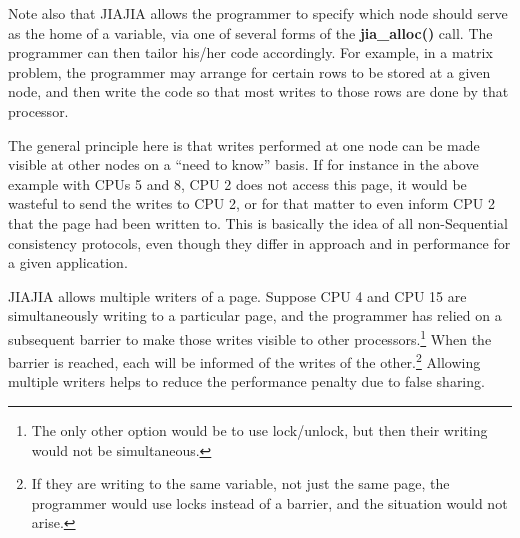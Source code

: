 Note also that JIAJIA allows the programmer to specify which node should
serve as the home of a variable, via one of several forms of the {\bf
jia\_alloc()} call.  The programmer can then tailor his/her code
accordingly.  For example, in a matrix problem, the programmer may
arrange for certain rows to be stored at a given node, and then write
the code so that most writes to those rows are done by that processor.

The general principle here is that writes performed at one node can be
made visible at other nodes on a ``need to know'' basis.  If for
instance in the above example with CPUs 5 and 8, CPU 2 does not access
this page, it would be wasteful to send the writes to CPU 2, or for that
matter to even inform CPU 2 that the page had been written to.  This is
basically the idea of all non-Sequential consistency protocols, even
though they differ in approach and in performance for a given
application.

JIAJIA allows multiple writers of a page.  Suppose CPU 4 and CPU 15 are
simultaneously writing to a particular page, and the programmer has
relied on a subsequent barrier to make those writes visible to other
processors.\footnote{The only other option would be to use lock/unlock,
but then their writing would not be simultaneous.}  When the barrier is
reached, each will be informed of the writes of the other.\footnote{If
they are writing to the same variable, not just the same page, the
programmer would use locks instead of a barrier, and the situation would
not arise.}  Allowing multiple writers helps to reduce the performance
penalty due to false sharing.

% 
% 
% 
% 
% 
% 
% 
% 
% 
% 


